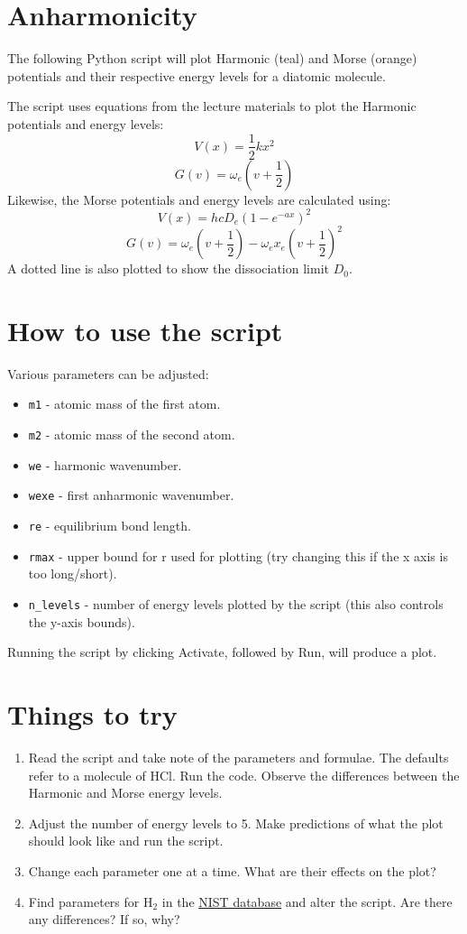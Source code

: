 \documentclass{article}
\begin{document}
\section{Anharmonicity}

The following Python script will plot Harmonic (teal) and Morse (orange) potentials and their respective energy levels for a diatomic molecule. \par\medskip 
\noindent The script uses equations from the lecture materials to plot the Harmonic potentials and energy levels:
\[V(x) = \frac{1}{2} kx^2\]
\[G(v) = \omega_e(v+\frac{1}{2})\]
Likewise, the Morse potentials and energy levels are calculated using:
\[V(x) = hcD_e(1-e^{-ax})^2\]
\[G(v) = \omega_e(v+\frac{1}{2})-\omega_ex_e(v+\frac{1}{2})^2\]
A dotted line is also plotted to show the dissociation limit $D_0$.

\section{How to use the script}
Various parameters can be adjusted: 
\begin{itemize}
\item \texttt{m1} - atomic mass of the first atom.
\item \texttt{m2} - atomic mass of the second atom.
\item \texttt{we} - harmonic wavenumber.
\item \texttt{wexe} - first anharmonic wavenumber.
\item \texttt{re} - equilibrium bond length.
\item \texttt{rmax} - upper bound for r used for plotting (try changing this if the x axis is too long/short).
\item \texttt{n\_levels} - number of energy levels plotted by the script (this also controls the y-axis bounds).
\end{itemize}
Running the script by clicking Activate, followed by Run, will produce a plot.

\section{Things to try}
\begin{enumerate}
\item Read the script and take note of the parameters and formulae. The defaults refer to a molecule of HCl. Run the code. Observe the differences between the Harmonic and Morse energy levels.
\item Adjust the number of energy levels to 5. Make predictions of what the plot should look like and run the script.
\item Change each parameter one at a time. What are their effects on the plot?
\item Find parameters for H$_2$ in the \href{https://webbook.nist.gov/cgi/cbook.cgi?ID=C1333740&Mask=1000}{NIST database} and alter the script. Are there any differences? If so, why?
\end{enumerate}
\end{document}
